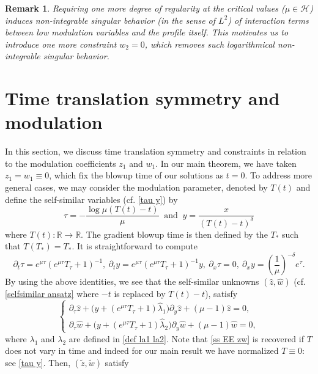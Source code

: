 \documentclass{article}
\newcommand{\R}{\mathbb{R}}
\newcommand{\la}{\lambda}
\newcommand{\pa}{\partial}
\def\be{\begin{equation}}
\def\ee{\end{equation}}
\numberwithin{equation}{section}
\newtheorem{remark}[theorem]{Remark}
\begin{document}
\begin{remark}
Requiring one more degree of regularity at the critical values ($\mu \in \mathcal H$) induces non-integrable singular behavior  (in the sense of $L^2$) of interaction terms between low modulation variables and the profile itself. This motivates us to introduce one more constraint $w_2=0$, which  removes such logarithmical non-integrable singular behavior. 
\end{remark}


\section{Time translation symmetry and modulation}\label{sec: TT} 

In this section, we discuss time translation symmetry and constraints in relation to the modulation coefficients $z_1$ and $w_1$. In our main theorem, we have taken $z_1=w_1\equiv 0$, which  
fix the blowup time of our solutions as $t=0$. To address more general cases, we may consider   
the modulation parameter,  denoted by $T(t)$ and define the self-similar variables (cf. \eqref{tau y}) by 
\be 
\tau = - \frac{\log \mu (T(t)- t)}{\mu}	\ \text{ and } \  y = \frac{x}{(T(t)-t)^\delta} %
\ee
where $T(t):\R\to \R$. The gradient blowup time is then defined by the $T_*$ such that $T(T_*)=T_*$. 
It is straightforward to compute
\[
	\pa_t\tau = e^{\mu \tau}( e^{\mu \tau}T_\tau +1)^{-1},\ \pa_t y =    e^{\mu \tau}( e^{\mu \tau}T_\tau +1)^{-1}y,\ \pa_x\tau=0,\ \pa_x y=(\frac{1}{\mu})^{-\delta} e^{ \tau}.
\]
By using the above identities, we see that the self-similar unknowns $(\hat z, \hat w)$ (cf. \eqref{selfsimilar ansatz} where $-t$ is replaced by $T(t)-t$),  %
 satisfy 
\be\begin{cases}
	\partial_\tau \hat z + \Big(y+(e^{\mu \tau}T_\tau+1)\hat \la_1\Big) \partial_y \hat z + (\mu-1)\hat z= 0,\\
	\partial_\tau \hat w + \Big(y+(e^{\mu \tau}T_\tau+1)\hat \la_2 \Big) \partial_y \hat w + (\mu-1)\hat w = 0,
	\end{cases}
\ee
where $\la_1$ and $\la_2$ are defined in \eqref{def la1 la2}. Note that  \eqref{ss EE zw} is recovered if $T$ does not vary in time and indeed for our main result we have normalized $T\equiv 0$: see \eqref{tau y}. 
Then, $(\tilde z, \tilde w)$ satisfy
\end{document}
